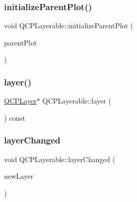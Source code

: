 \mbox{\label{class_q_c_p_layerable_a8cbe5a0c9a5674249982f5ca5f8e02bc}} 
\subsubsection{\texorpdfstring{initializeParentPlot()}{initializeParentPlot()}}
{\footnotesize\ttfamily void Q\+C\+P\+Layerable\+::initialize\+Parent\+Plot (\begin{DoxyParamCaption}\item[{\mbox{\hyperlink{class_q_custom_plot}{Q\+Custom\+Plot}} $\ast$}]{parent\+Plot }\end{DoxyParamCaption})\hspace{0.3cm}{\ttfamily [protected]}}

\mbox{\label{class_q_c_p_layerable_a5ff4862e8c784c9f5986dbc1533ba2a4}} 
\subsubsection{\texorpdfstring{layer()}{layer()}}
{\footnotesize\ttfamily \mbox{\hyperlink{class_q_c_p_layer}{Q\+C\+P\+Layer}}$\ast$ Q\+C\+P\+Layerable\+::layer (\begin{DoxyParamCaption}{ }\end{DoxyParamCaption}) const\hspace{0.3cm}{\ttfamily [inline]}}

\mbox{\label{class_q_c_p_layerable_abbf8657cedea73ac1c3499b521c90eba}} 
\subsubsection{\texorpdfstring{layerChanged}{layerChanged}}
{\footnotesize\ttfamily void Q\+C\+P\+Layerable\+::layer\+Changed (\begin{DoxyParamCaption}\item[{\mbox{\hyperlink{class_q_c_p_layer}{Q\+C\+P\+Layer}} $\ast$}]{new\+Layer }\end{DoxyParamCaption})\hspace{0.3cm}{\ttfamily [signal]}}

